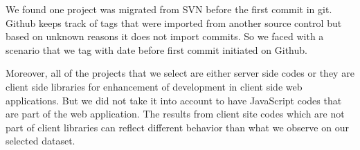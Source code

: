 \par
We found one project was migrated from SVN before the first commit in git. Github keeps track of tags that were imported from another source control but based on unknown reasons it does not import commits. So we faced with a scenario that we tag with date before first commit initiated on Github. 


\par
Moreover, all of the projects that we select are either server side codes or they are client side libraries for enhancement of development in client side web applications. But we did not take it into account to have JavaScript codes that are part of the web application. The results from client site codes which are not part of client libraries can reflect different behavior than what we observe on our selected dataset.
